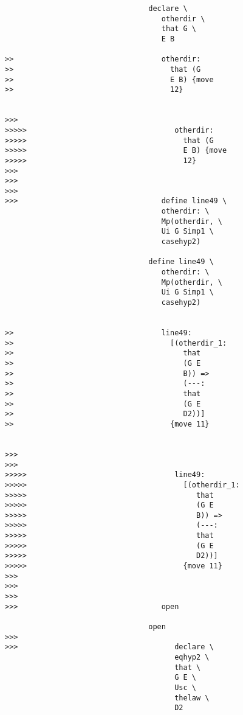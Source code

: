 \documentclass[12pt]{article}
\begin{document}
\begin{verbatim}
                                 declare \
                                    otherdir \
                                    that G \
                                    E B

>>                                  otherdir:
>>                                    that (G
>>                                    E B) {move
>>                                    12}


>>>
>>>>>                                  otherdir:
>>>>>                                    that (G
>>>>>                                    E B) {move
>>>>>                                    12}
>>>
>>>
>>>
>>>                                 define line49 \
                                    otherdir: \
                                    Mp(otherdir, \
                                    Ui G Simp1 \
                                    casehyp2)

                                 define line49 \
                                    otherdir: \
                                    Mp(otherdir, \
                                    Ui G Simp1 \
                                    casehyp2)


>>                                  line49:
>>                                    [(otherdir_1:
>>                                       that
>>                                       (G E
>>                                       B)) =>
>>                                       (---:
>>                                       that
>>                                       (G E
>>                                       D2))]
>>                                    {move 11}


>>>
>>>
>>>>>                                  line49:
>>>>>                                    [(otherdir_1:
>>>>>                                       that
>>>>>                                       (G E
>>>>>                                       B)) =>
>>>>>                                       (---:
>>>>>                                       that
>>>>>                                       (G E
>>>>>                                       D2))]
>>>>>                                    {move 11}
>>>
>>>
>>>
>>>                                 open

                                 open
>>>
>>>                                    declare \
                                       eqhyp2 \
                                       that \
                                       G E \
                                       Usc \
                                       thelaw \
                                       D2


\end{verbatim}
\end{document}
